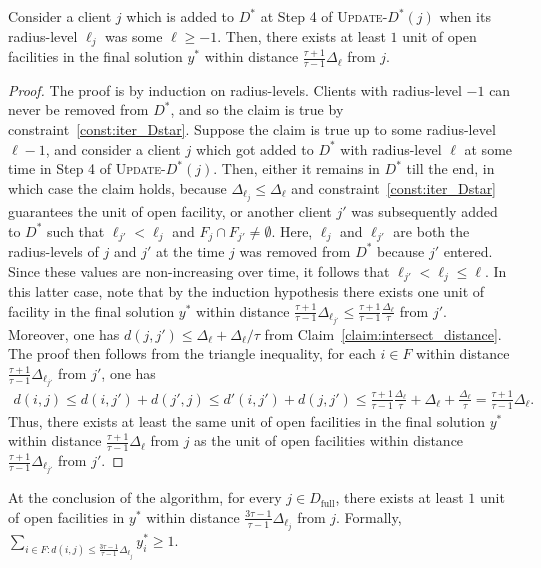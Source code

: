 \begin{claim} \label{claim:Dstar_distance}
Consider a client $j$ which is added to $D^*$ at Step 4 of \textsc{Update-$D^*$}$(j)$ when its radius-level $\ell_j$ was some $\ell \ge -1$. Then, there exists at least $1$ unit of open facilities in the final solution $y^*$ within distance $\frac{\tau+1}{\tau-1}\Delta_\ell$ from $j$.
\end{claim}

\begin{proof}
The proof is by induction on radius-levels. Clients with radius-level $-1$ can never be removed from $D^*$, and so the claim is true by constraint~\ref{const:iter_Dstar}. Suppose the claim is true up to some radius-level $\ell-1$, and consider a client $j$ which got added to $D^*$ with radius-level $\ell$ at some time in Step 4 of \textsc{Update-$D^*$}$(j)$. Then, either it remains in $D^*$ till the end, in which case the claim holds, because $\Delta_{\ell_j} \leq \Delta_\ell$ and constraint~\ref{const:iter_Dstar} guarantees the unit of open facility, or another client $j'$ was subsequently added to $D^*$ such that $\ell_{j'} < \ell_j$ and $F_j \cap F_{j'} \neq \emptyset$. Here, $\ell_j$ and $\ell_{j'}$ are both the radius-levels of $j$ and $j'$ at the time $j$ was removed from $D^*$ because $j'$ entered. Since these values are non-increasing over time, it follows that $\ell_{j'} < \ell_j \le \ell$.
In this latter case, note that by the induction hypothesis there exists one unit of facility in the final solution $y^*$ within distance $\frac{\tau+1}{\tau-1}\Delta_{\ell_{j'}} \le \frac{\tau+1}{\tau-1}\frac{\Delta_\ell}{\tau}$ from $j'$. Moreover, one has $d(j, j') \le \Delta_\ell + \Delta_\ell/\tau$ from Claim~\ref{claim:intersect_distance}. The proof then follows from the triangle inequality, for each $i \in F$ within distance $\frac{\tau+1}{\tau-1}\Delta_{\ell_{j'}}$ from $j'$, one has
\begin{align*}
d(i,j) \leq d(i,j') + d(j',j) \leq d'(i,j') + d(j,j') \le \frac{\tau+1}{\tau-1}\frac{\Delta_\ell}{\tau} + \Delta_\ell + \frac{\Delta_\ell}{\tau} = \frac{\tau+1}{\tau-1}\Delta_\ell.
\end{align*}
Thus, there exists at least the same unit of open facilities in the final solution $y^*$ within distance $\frac{\tau+1}{\tau-1}\Delta_{\ell}$ from $j$ as the unit of open facilities within distance $\frac{\tau+1}{\tau-1}\Delta_{\ell_{j'}}$ from $j'$.
\end{proof}

\begin{lemma} \label{lem:full_client_distance}
At the conclusion of the algorithm, for every $j \in D_\text{full}$, there exists at least $1$ unit of open facilities in $y^*$ within distance $\frac{3\tau-1}{\tau-1}\Delta_{\ell_j}$ from $j$. Formally, $\sum_{i \in F : d(i,j) \le \frac{3\tau-1}{\tau-1}\Delta_{\ell_j}} y^*_i \ge 1$.
\end{lemma}

